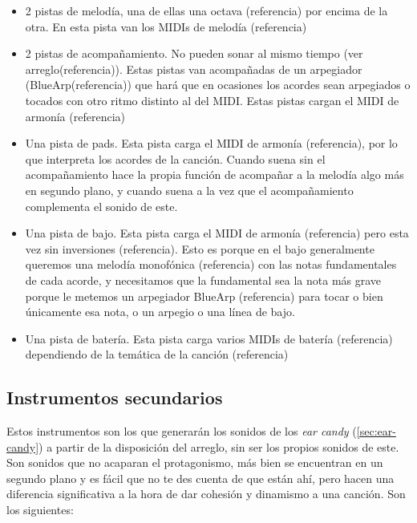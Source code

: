 \begin{itemize}
\item 2 pistas de melodía, una de ellas una octava (referencia) por encima de la otra. En esta pista van los MIDIs de melodía (referencia)
\item 2 pistas de acompañamiento. No pueden sonar al mismo tiempo (ver arreglo(referencia)). Estas pistas van acompañadas de un arpegiador (BlueArp(referencia)) que hará que en ocasiones los acordes sean arpegiados o tocados con otro ritmo distinto al del MIDI. Estas pistas cargan el MIDI de armonía (referencia)
\item Una pista de pads. Esta pista carga el MIDI de armonía (referencia), por lo que interpreta los acordes de la canción. Cuando suena sin el acompañamiento hace la propia función de acompañar a la melodía algo más en segundo plano, y cuando suena a la vez que el acompañamiento complementa el sonido de este.
\item Una pista de bajo. Esta pista carga el MIDI de armonía (referencia) pero esta vez sin inversiones (referencia). Esto es porque en el bajo generalmente queremos una melodía monofónica (referencia) con las notas fundamentales de cada acorde, y necesitamos que la fundamental sea la nota más grave porque le metemos un arpegiador BlueArp (referencia) para tocar o bien únicamente esa nota, o un arpegio o una línea de bajo.
\item Una pista de batería. Esta pista carga varios MIDIs de batería (referencia) dependiendo de la temática de la canción (referencia)
\end{itemize}

\subsection{Instrumentos secundarios}
\label{subsec:instrumentos-secundarios}
Estos instrumentos son los que generarán los sonidos de los \textit{ear candy} (\ref{sec:ear-candy}) a partir de la disposición del arreglo, sin ser los propios sonidos de este. Son sonidos que no acaparan el protagonismo, más bien se encuentran en un segundo plano y es fácil que no te des cuenta de que están ahí, pero hacen una diferencia significativa a la hora de dar cohesión y dinamismo a una canción. Son los siguientes:



